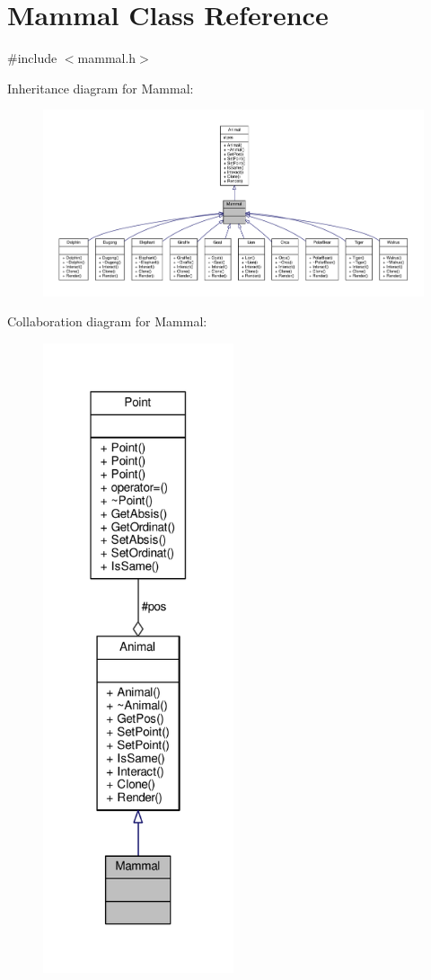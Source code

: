 \hypertarget{classMammal}{}\section{Mammal Class Reference}
\label{classMammal}


{\ttfamily \#include $<$mammal.\+h$>$}



Inheritance diagram for Mammal\+:
\nopagebreak
\begin{figure}[H]
\begin{center}
\leavevmode
\includegraphics[width=350pt]{classMammal__inherit__graph}
\end{center}
\end{figure}


Collaboration diagram for Mammal\+:
\nopagebreak
\begin{figure}[H]
\begin{center}
\leavevmode
\includegraphics[width=159pt]{classMammal__coll__graph}
\end{center}
\end{figure}
